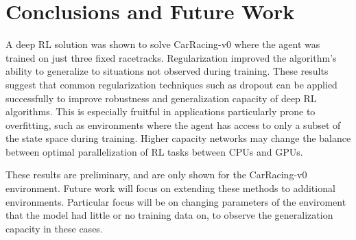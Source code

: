 \documentclass{article}
\begin{document}
\section{Conclusions and Future Work}
A deep RL solution was shown to solve CarRacing-v0 where the agent was
trained on just three fixed racetracks. 
Regularization improved the algorithm's ability to generalize to
situations not observed during training. These results suggest
that common regularization techniques such as dropout can be
applied successfully to improve robustness and generalization capacity
of deep RL algorithms. This is especially fruitful in applications
particularly prone to overfitting, such as environments where the
agent has access to only a subset of the state space during training.
Higher capacity networks may change the balance between optimal
parallelization of RL tasks between CPUs and GPUs\cite{stooke2018accelerated}. 

These results are preliminary, and are only shown for the CarRacing-v0
environment. Future work will focus on extending these methods to
additional environments. Particular focus will be on changing
parameters of the enviroment that the model had little or no training
data on, to observe the generalization capacity in these cases. 




\end{document}

